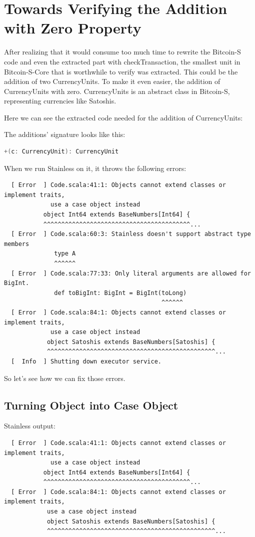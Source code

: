 \chapter{Towards Verifying the Addition with Zero Property}
\label{chap:verify_add}

After realizing that it would consume too much time to rewrite the Bitcoin-S code and even the extracted part with checkTransaction, the smallest unit in Bitcoin-S-Core that is worthwhile to verify was extracted.
This could be the addition of two CurrencyUnits.
To make it even easier, the addition of CurrencyUnits with zero.
CurrencyUnits is an abstract class in Bitcoin-S, representing currencies like Satoshis.

Here we can see the extracted code needed for the addition of CurrencyUnits:


The additions' signature looks like this:
\begin{lstlisting}[language=scala]
  +(c: CurrencyUnit): CurrencyUnit
\end{lstlisting}

When we run Stainless on it, it throws the following errors:
{\footnotesize\begin{verbatim}
  [ Error  ] Code.scala:41:1: Objects cannot extend classes or implement traits,
             use a case object instead
           object Int64 extends BaseNumbers[Int64] {
           ^^^^^^^^^^^^^^^^^^^^^^^^^^^^^^^^^^^^^^^^^...
  [ Error  ] Code.scala:60:3: Stainless doesn't support abstract type members
              type A
              ^^^^^^
  [ Error  ] Code.scala:77:33: Only literal arguments are allowed for BigInt.
              def toBigInt: BigInt = BigInt(toLong)
                                            ^^^^^^
  [ Error  ] Code.scala:84:1: Objects cannot extend classes or implement traits,
             use a case object instead
            object Satoshis extends BaseNumbers[Satoshis] {
            ^^^^^^^^^^^^^^^^^^^^^^^^^^^^^^^^^^^^^^^^^^^^^^^...
  [  Info  ] Shutting down executor service.
\end{verbatim}}

So let's see how we can fix those errors.


\section{Turning Object into Case Object}

Stainless output:
{\footnotesize\begin{verbatim}
  [ Error  ] Code.scala:41:1: Objects cannot extend classes or implement traits,
             use a case object instead
           object Int64 extends BaseNumbers[Int64] {
           ^^^^^^^^^^^^^^^^^^^^^^^^^^^^^^^^^^^^^^^^^...
  [ Error  ] Code.scala:84:1: Objects cannot extend classes or implement traits,
            use a case object instead
            object Satoshis extends BaseNumbers[Satoshis] {
            ^^^^^^^^^^^^^^^^^^^^^^^^^^^^^^^^^^^^^^^^^^^^^^^...
\end{verbatim}}


